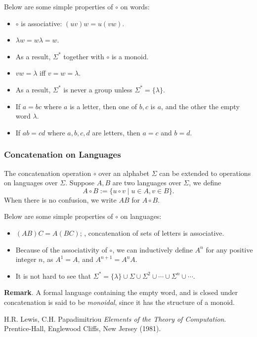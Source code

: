 \documentclass[12pt]{article}
\begin{document}
Below are some simple properties of $\circ$ on words:
\begin{itemize}
\item $\circ$ is associative: $(uv)w=u(vw)$.
\item $\lambda w=w\lambda = w$.
\item As a result, $\Sigma^*$ together with $\circ$ is a monoid.
\item $vw=\lambda$ iff $v=w=\lambda$.
\item As a result, $\Sigma^*$ is never a group unless $\Sigma^*=\lbrace \lambda\rbrace$.
\item If $a=bc$ where $a$ is a letter, then one of $b,c$ is $a$, and the other the empty word $\lambda$.
\item If $ab=cd$ where $a,b,c,d$ are letters, then $a=c$ and $b=d$.
\end{itemize}

\subsubsection*{Concatenation on Languages}

The concatenation operation $\circ$ over an alphabet $\Sigma$ can be extended to operations on languages over $\Sigma$.  Suppose $A,B$ are two languages over $\Sigma$, we define $$A\circ B:= \lbrace u\circ v \mid u\in A, v\in B\rbrace.$$
When there is no confusion, we write $AB$ for $A\circ B$.

Below are some simple properties of $\circ$ on languages:
\begin{itemize}
\item $(AB)C=A(BC)$; , concatenation of sets of letters is associative.
\item Because of the associativity of $\circ$, we can inductively define $A^n$ for any positive integer $n$, as $A^1=A$, and $A^{n+1}=A^nA$.
\item It is not hard to see that $\Sigma^*=\lbrace \lambda \rbrace \cup \Sigma \cup \Sigma^2 \cup \cdots \cup \Sigma^n \cup \cdots$.
\end{itemize}

\textbf{Remark}.  A formal language containing the empty word, and is closed under concatenation is said to be \emph{monoidal}, since it has the structure of a monoid.

\begin{thebibliography}{9}
 H.R. Lewis, C.H. Papadimitriou {\em Elements of the Theory of Computation}. Prentice-Hall, Englewood Cliffs, New Jersey (1981).
\end{thebibliography}
\end{document}
